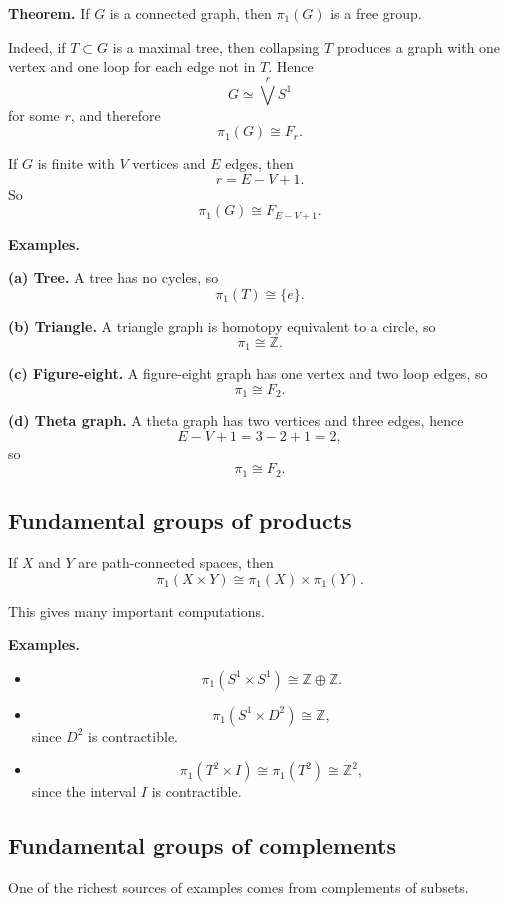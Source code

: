 \documentclass[12pt,a4paper]{article}
\theoremstyle{notespace}
\begin{document}
\textbf{Theorem.}
If \(G\) is a connected graph, then \(\pi_1(G)\) is a free group.

Indeed, if \(T\subset G\) is a maximal tree, then collapsing \(T\) produces a graph with one vertex and one loop for each edge not in \(T\). Hence
\[
G \simeq \bigvee^r S^1
\]
for some \(r\), and therefore
\[
\pi_1(G)\cong F_r.
\]

If \(G\) is finite with \(V\) vertices and \(E\) edges, then
\[
r=E-V+1.
\]
So
\[
\pi_1(G)\cong F_{E-V+1}.
\]

\medskip

\textbf{Examples.}

\textbf{(a) Tree.}
A tree has no cycles, so
\[
\pi_1(T)\cong \{e\}.
\]

\textbf{(b) Triangle.}
A triangle graph is homotopy equivalent to a circle, so
\[
\pi_1 \cong \mathbb Z.
\]

\textbf{(c) Figure-eight.}
A figure-eight graph has one vertex and two loop edges, so
\[
\pi_1 \cong F_2.
\]

\textbf{(d) Theta graph.}
A theta graph has two vertices and three edges, hence
\[
E-V+1=3-2+1=2,
\]
so
\[
\pi_1 \cong F_2.
\]

\subsection{Fundamental groups of products}

If \(X\) and \(Y\) are path-connected spaces, then
\[
\pi_1(X\times Y)\cong \pi_1(X)\times \pi_1(Y).
\]

This gives many important computations.

\medskip

\textbf{Examples.}
\begin{itemize}
	\item
	\[
	\pi_1(S^1\times S^1)\cong \mathbb Z\oplus \mathbb Z.
	\]
	\item
	\[
	\pi_1(S^1\times D^2)\cong \mathbb Z,
	\]
	since \(D^2\) is contractible.
	\item
	\[
	\pi_1(T^2\times I)\cong \pi_1(T^2)\cong \mathbb Z^2,
	\]
	since the interval \(I\) is contractible.
\end{itemize}

\subsection{Fundamental groups of complements}

One of the richest sources of examples comes from complements of subsets.
\end{document}
